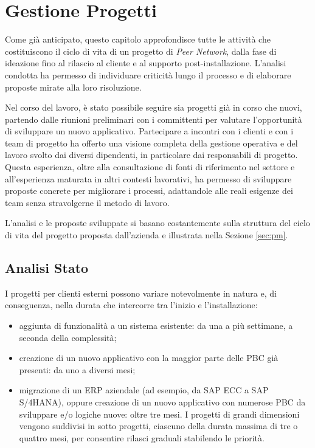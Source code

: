 \chapter{Gestione Progetti}
\label{chap:pm}

Come già anticipato, questo capitolo approfondisce tutte le attività che costituiscono il ciclo di vita
di un progetto di \textit{Peer Network}, dalla fase di ideazione fino al rilascio al cliente e al supporto post-installazione.
L’analisi condotta ha permesso di individuare criticità lungo il processo e di elaborare proposte mirate alla loro risoluzione.

Nel corso del lavoro, è stato possibile seguire sia progetti già in corso che nuovi, partendo dalle riunioni
preliminari con i committenti per valutare l’opportunità di sviluppare un nuovo applicativo. Partecipare a incontri
con i clienti e con i team di progetto ha offerto una visione completa della gestione operativa e del lavoro
svolto dai diversi dipendenti, in particolare dai responsabili di progetto. Questa esperienza, oltre alla
consultazione di fonti di riferimento nel settore e all’esperienza maturata in altri contesti lavorativi,
ha permesso di sviluppare proposte concrete per migliorare i processi, adattandole alle reali esigenze dei
team senza stravolgerne il metodo di lavoro.

L'analisi e le proposte sviluppate si basano costantemente sulla struttura del ciclo di vita del progetto proposta dall'azienda
e illustrata nella Sezione \ref{sec:pm}.

\section{Analisi Stato}
I progetti per clienti esterni possono variare notevolmente in natura e, di conseguenza, nella durata che intercorre tra l’inizio e l'installazione:
\begin{itemize}
    \item aggiunta di funzionalità a un sistema esistente: da una a più settimane, a seconda della complessità;
    \item creazione di un nuovo applicativo con la maggior parte delle \ac{PBC} già presenti: da uno a diversi mesi;
    \item migrazione di un \ac{ERP} aziendale (ad esempio, da SAP ECC a SAP S/4HANA), oppure creazione di un nuovo
    applicativo con numerose \ac{PBC} da sviluppare e/o logiche nuove: oltre tre mesi. I progetti di grandi dimensioni
    vengono suddivisi in sotto progetti, ciascuno della durata massima di tre o quattro mesi, per consentire rilasci graduali stabilendo le priorità.
\end{itemize}

